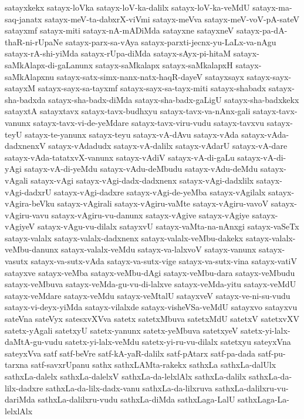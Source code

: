 {satayxkekx
satayx-loVka
satayx-loV-ka-dalilx
satayx-loV-ka-veMdU
satayx-ma-saq-janatx
satayx-meV-ta-dabxrX-viVmi
satayx-meVva
satayx-meV-voV-pA-sateV
satayxmf
satayx-miti
satayx-nA-mADiMda
satayxne
satayxneV
satayx-pa-dA-thaR-ni-rUpaNe
satayx-parx-sa-vAya
satayx-parxti-jecnx-yu-LaLx-va-nAgu
satayx-rA-shi-yiMda
satayx-rUpa-diMda
satayx-sAyx-pi-hitaM
satayx-saMkAlapx-di-gaLanunx
satayx-saMkalapx
satayx-saMkalapxH
satayx-saMkAlapxnu
satayx-satx-simx-nanx-natx-haqR-dayeV
satayxsayx
satayx-sayx-satayxM
satayx-sayx-sa-tayxmf
satayx-sayx-sa-tayx-miti
satayx-shabadx
satayx-sha-badxda
satayx-sha-badx-diMda
satayx-sha-badx-gaLigU
satayx-sha-badxkekx
satayxtA
satayxtavx
satayx-tavx-budhxyu
satayx-tavx-va-nAnx-gali
satayx-tavx-vanunx
satayx-tavx-vi-de-yeMdare
satayx-tavx-viru-vudu
satayx-tavxvu
satayx-teyU
satayx-te-yanunx
satayx-teyu
satayx-vA-dAvu
satayx-vAda
satayx-vAda-dadxnenxV
satayx-vAdadudx
satayx-vA-dalilx
satayx-vAdarU
satayx-vA-dare
satayx-vAda-tatatxvX-vanunx
satayx-vAdiV
satayx-vA-di-gaLu
satayx-vA-di-yAgi
satayx-vA-di-yeMdu
satayx-vAdu-deMbudu
satayx-vAdu-deMdu
satayx-vAgali
satayx-vAgi
satayx-vAgi-dadx-dadxnenx
satayx-vAgi-dadxlilx
satayx-vAgi-dadxrU
satayx-vAgi-dadxre
satayx-vAgi-de-yeMba
satayx-vAgilalx
satayx-vAgira-beVku
satayx-vAgirali
satayx-vAgiru-vaMte
satayx-vAgiru-vavoV
satayx-vAgiru-vavu
satayx-vAgiru-vu-danunx
satayx-vAgive
satayx-vAgiye
satayx-vAgiyeV
satayx-vAgu-vu-dilalx
satayxvU
satayx-vaMta-na-nAnxgi
satayx-vaSeTx
satayx-valalx
satayx-valalx-dadxnenx
satayx-valalx-veMbu-dakekx
satayx-valalx-veMbu-danunx
satayx-valalx-veMdu
satayx-va-lalxvoV
satayx-vanunx
satayx-vasutx
satayx-va-sutx-vAda
satayx-va-sutx-vige
satayx-va-sutx-vina
satayx-vatiV
satayxve
satayx-veMba
satayx-veMbu-dAgi
satayx-veMbu-dara
satayx-veMbudu
satayx-veMbuva
satayx-veMda-gu-vu-di-lalxve
satayx-veMda-yitu
satayx-veMdU
satayx-veMdare
satayx-veMdu
satayx-veMtalU
satayxveV
satayx-ve-ni-su-vudu
satayx-vi-deyx-yiMda
satayx-vilalxde
satayx-visheVSa-veMdU
satayxvo
satayxvu
sateVna
sateVyx
satesxvXVva
satetx
satetxMbuva
satetxMdU
satetxV
satetxvXV
satetx-yAgali
satetxyU
satetx-yanunx
satetx-yeMbuva
satetxyeV
satetx-yi-lalx-daMtA-gu-vudu
satetx-yi-lalx-veMdu
satetx-yi-ru-vu-dilalx
satetxyu
sateyxVna
sateyxVva
satf
satf-beVre
satf-kA-yaR-dalilx
satf-pAtarx
satf-pa-dada
satf-pu-tarxna
satf-savxrUpanu
sathx
sathxLAMta-rakekx
sathxLa
sathxLa-dalUlx
sathxLa-dalelx
sathxLa-dalelxV
sathxLa-da-lelxlAlx
sathxLa-dalilx
sathxLa-da-lilx-dadxre
sathxLa-da-lilx-dadx-vanu
sathxLa-da-lilxruva
sathxLa-dalilxru-vu-dariMda
sathxLa-dalilxru-vudu
sathxLa-diMda
sathxLaga-LalU
sathxLaga-La-lelxlAlx
}
